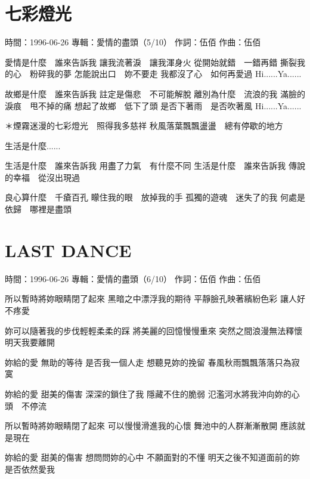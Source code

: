 \documentclass[UTF8,a4paper,oneside,twocolumn,12pt]{ctexbook}
\newcommand{\infopair}[2]{\textbullet #1：#2}
\newcommand{\zc}[1][伍佰]{\infopair{作詞}{#1}}
\newcommand{\zq}[1][伍佰]{\infopair{作曲}{#1}}
\newcommand{\zj}[1]{\infopair{專輯}{#1}}
\newcommand{\sj}[1]{\infopair{時間}{#1}}
\newenvironment{info}{\begin{flushleft}\kaishu
	}
	{\end{flushleft}\normalsize\yahei\par}
\newenvironment{lyric}{
	}
{}
\begin{document}
\section{七彩燈光}
\begin{info}
	\sj{1996-06-26}
	\zj{愛情的盡頭（5/10）}
	\zc
	\zq
\end{info}
\begin{lyric}
	愛情是什麼　誰來告訴我
	讓我流著淚　讓我渾身火
	從開始就錯　一錯再錯
	撕裂我的心　粉碎我的夢
	怎能說出口　妳不要走
	我都沒了心　如何再愛過
	Hi......Ya......

	故鄉是什麼　誰來告訴我
	註定是傷悲　不可能解脫
	離別為什麼　流浪的我
	滿臉的淚痕　甩不掉的痛
	想起了故鄉　低下了頭
	是否下著雨　是否吹著風
	Hi......Ya......

	＊煙霧迷漫的七彩燈光　照得我多慈祥
	秋風落葉飄飄盪盪　總有停歇的地方

	生活是什麼......

	生活是什麼　誰來告訴我
	用盡了力氣　有什麼不同
	生活是什麼　誰來告訴我
	傳說的幸福　從沒出現過

	良心算什麼　千瘡百孔
	矇住我的眼　放掉我的手
	孤獨的遊魂　迷失了的我
	何處是依歸　哪裡是盡頭
\end{lyric}

\section{LAST DANCE}
\begin{info}
	\sj{1996-06-26}
	\zj{愛情的盡頭（6/10）}
	\zc
	\zq
\end{info}
\begin{lyric}
	所以暫時將妳眼睛閉了起來
	黑暗之中漂浮我的期待
	平靜臉孔映著繽紛色彩
	讓人好不疼愛

	妳可以隨著我的步伐輕輕柔柔的踩
	將美麗的回憶慢慢重來
	突然之間浪漫無法釋懷
	明天我要離開

	妳給的愛
	無助的等待
	是否我一個人走
	想聽見妳的挽留
	春風秋雨飄飄落落只為寂寞

	妳給的愛
	甜美的傷害
	深深的鎖住了我
	隱藏不住的脆弱
	氾濫河水將我沖向妳的心頭　不停流

	所以暫時將妳眼睛閉了起來
	可以慢慢滑進我的心懷
	舞池中的人群漸漸散開
	應該就是現在

	妳給的愛
	甜美的傷害
	想問問妳的心中
	不願面對的不懂
	明天之後不知道面前的妳是否依然愛我
\end{lyric}
\end{document}
